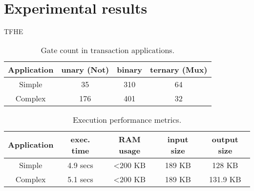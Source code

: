 \documentclass{article}
\begin{document}
\section{Experimental results}

TFHE~\cite{CGGI18}

\begin{table}[]
    \centering
    \begin{tabular}{c|c|c|c}
        Application & unary (Not) & binary & ternary (Mux) \\
        \hline
        Simple & 35 & 310 & 64 \\
        Complex & 176 & 401 & 32 
    \end{tabular}
    \caption{Gate count in transaction applications.}
    \label{tab:gate_count}
\end{table}


\begin{table}[]
    \centering
    \begin{tabular}{c|c|c|c|c}
        Application & exec. time & RAM usage & input size & output size \\
        \hline
        Simple & 4.9 secs & <200 KB & 189 KB & 128 KB\\
        Complex & 5.1 secs & <200 KB & 189 KB & 131.9 KB
    \end{tabular}
    \caption{Execution performance metrics.%
    }
    \label{tab:exec_time}
\end{table}





\end{document}
